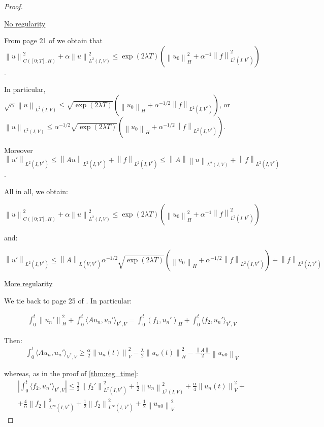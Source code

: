 \documentclass[english,a4paper,12pt,oneside]{scrbook}
\theoremstyle{break}
\newenvironment{mproof}[1][\proofname]{%
  \begin{proof}[#1]$ $\par\nobreak\ignorespaces
}{%
  \end{proof}
}
\renewcommand*{\proofname}{Proof}
\theoremstyle{remark}
\newcommand{\norm}[1]{\left\lVert#1\right\rVert}
\newcommand{\HN}[1]{\norm{#1}_{H}}
\newcommand{\VN}[1]{\norm{#1}_{V}}
\begin{document}
\begin{mproof}

\underline{No regularity}

From page 21 of \cite{gilardi} we obtain that $\norm{u}^2_{C([0;T],H)}+\alpha\norm{u}_{L^2(I,V)}^2\leq \exp(2\lambda T)(\HN{u_0}^2+\alpha^{-1}\norm{f}^2_{L^2(I,V^*)})$.

In particular, $\sqrt{\alpha}\norm{u}_{L^2(I,V)}\leq 	\sqrt{\exp(2\lambda T)}(\HN{u_0}+\alpha^{-1/2}\norm{f}_{L^2(I,V^*)})$, or $\norm{u}_{L^2(I,V)}\leq 	\alpha^{-1/2}\sqrt{\exp(2\lambda T)}(\HN{u_0}+\alpha^{-1/2}\norm{f}_{L^2(I,V^*)})$.

Moreover $\norm{u'}_{L^2(I,V^*)}\leq \norm{Au}_{L^2(I,V^*)}+\norm{f}_{L^2(I,V^*)}\leq \norm{A}\norm{u}_{L^2(I,V)}+\norm{f}_{L^2(I,V^*)}$.

All in all, we obtain:

$$\norm{u}^2_{C([0;T],H)}+\alpha\norm{u}_{L^2(I,V)}^2\leq \exp(2\lambda T)(\HN{u_0}^2+\alpha^{-1}\norm{f}^2_{L^2(I,V^*)})$$

and:

$$\norm{u'}_{L^2(I,V^*)}\leq \norm{A}_{L(V,V^*)}	\alpha^{-1/2}\sqrt{\exp(2\lambda T)}(\HN{u_0}+\alpha^{-1/2}\norm{f}_{L^2(I,V^*)})+\norm{f}_{L^2(I,V^*)}$$

\underline{More regularity}

We tie back to page 25 of \cite{gilardi}. In particular:

\begin{align*}
\int_0^t\HN{u_n'}^2+\int_0^t\langle A u_n, u_n'\rangle_{V^*,V}=\int_0^t(f_1,u_n')_H+\int_0^t \langle f_2, u_n'\rangle_{V^*,V}
\end{align*}


Then:
\begin{align*}
\int_0^t\langle A u_n, u_n'\rangle_{V^*,V}\geq \frac{\alpha}{2}\VN{u_n(t)}^2-\frac{\lambda}{2}\HN{u_n(t)}^2-\frac{\norm{A}}{2}\VN{u_{n0}}
\end{align*}

whereas, as in the proof of \cref{thm:reg_time}:
\begin{align*}
	\left | \int_0^t \langle f_2,u_n' \rangle_{V^*,V}\right | \leq
	\frac{1}{2}\norm{f_2'}_{L^2(I,V^*)}^2 + \frac{1}{2}\norm{u_n}_{L^2(I,V)}^2 + \frac{\alpha}{4}\VN{u_n(t)}^2 +\\
	+ \frac{4}{\alpha}\norm{f_2}_{L^\infty(I,V^*)}^2+ \frac{1}{2}\norm{f_2}_{L^\infty(I,V^*)}^2+\frac{1}{2}\VN{u_{n0}}^2
\end{align*}


\end{mproof}
\end{document}
